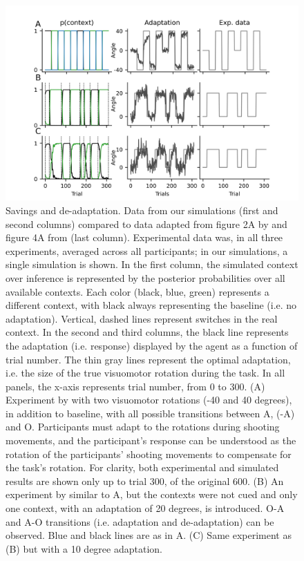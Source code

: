 \documentclass[a4paper,doc,floatsintext,natbib]{apa6}%
\begin{document}
\begin{figure}
\centering
\includegraphics{./figures/figure_2.png}
\caption{Savings and de-adaptation. Data from our simulations (first and second columns) compared to data adapted from figure 2A by \cite{Kim_Neural_2015} and figure 4A from \cite{Oh_Minimizing_2019} (last column). Experimental data was, in all three experiments, averaged across all participants; in our simulations, a single simulation is shown. In the first column, the simulated context over inference is represented by the posterior probabilities over all available contexts. Each color (black, blue, green) represents a different context, with black always representing the baseline (i.e. no adaptation). Vertical, dashed lines represent switches in the real context. In the second and third columns, the black line represents the adaptation (i.e. response) displayed by the agent as a function of trial number. The thin gray lines represent the optimal adaptation, i.e. the size of the true visuomotor rotation during the task. In all panels, the x-axis represents trial number, from 0 to 300. (A) Experiment by \cite{Kim_Neural_2015} with two visuomotor rotations (-40 and 40 degrees), in addition to baseline, with all possible transitions between A, (-A) and O. Participants must adapt to the rotations during shooting movements, and the participant's response can be understood as the rotation of the participants' shooting movements to compensate for the task's rotation. For clarity, both experimental and simulated results are shown only up to trial 300, of the original 600. (B) An experiment by \cite{Oh_Minimizing_2019} similar to A, but the contexts were not cued and only one context, with an adaptation of 20 degrees, is introduced. O-A and A-O transitions (i.e. adaptation and de-adaptation) can be observed. Blue and black lines are as in A. (C) Same experiment as (B) but with a 10 degree adaptation.}
\label{fig:oh-2019}
\end{figure}
\end{document}
